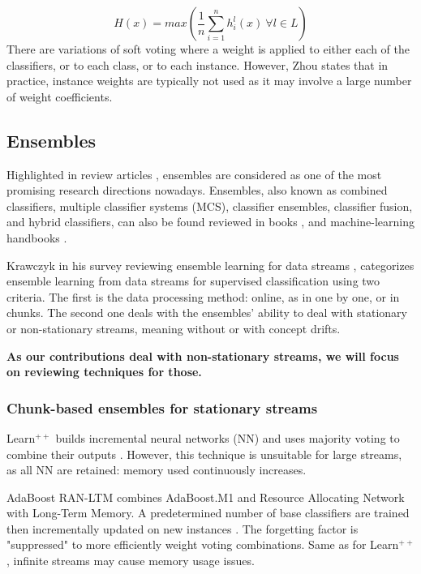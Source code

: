 \begin{equation}
H(x)=max( \frac{1}{n}\sum_{i=1}^nh_i^l(x)\ \forall l \in L)
\label{eq:simple_soft}
\end{equation}
There are variations of soft voting where a weight is applied to either each of the classifiers, or to each class, or to each instance. However, Zhou states that in practice, instance weights are typically not used as it may involve a large number of weight coefficients.



\subsection{Ensembles \label{section:ensembles}}
Highlighted in review articles \cite{jain2000statistical, KRAWCZYK2017132, oza2008classifier, polikar2006ensemble, rokach2009taxonomy, wozniak2014survey}, ensembles are considered as one of the most promising research directions nowadays. Ensembles, also known as combined classifiers, multiple classifier systems (MCS), classifier ensembles, classifier fusion, and hybrid classifiers, can also be found reviewed in books \cite{baruque2011fusion, kuncheva2004combining,rokach2010pattern,seni2010ensemble}, and machine-learning handbooks \cite{alpaydin2009introduction, duda2012pattern}.

Krawczyk in his survey reviewing ensemble learning for data streams \cite{KRAWCZYK2017132}, categorizes ensemble learning from data streams for supervised classification using two criteria. The first is the data processing method: online, as in one by one, or in chunks. The second one deals with the ensembles' ability to deal with stationary or non-stationary streams, meaning without or with concept drifts.

\textbf{As our contributions deal with non-stationary streams, we will focus on reviewing techniques for those.}

\subsubsection{Chunk-based ensembles for stationary streams}

Learn$^{++}$ builds incremental neural networks (NN) and uses majority voting to combine their outputs \cite{polikar2001learn++, KRAWCZYK2017132}. However, this technique is unsuitable for large streams, as all NN are retained: memory used continuously increases.

AdaBoost RAN-LTM combines AdaBoost.M1 and Resource Allocating Network with Long-Term Memory. A predetermined number of base classifiers are trained then incrementally updated on new instances \cite{kidera2006incremental, KRAWCZYK2017132}. The forgetting factor is "suppressed" to more efficiently weight voting combinations. Same as for Learn$^{++}$, infinite streams may cause memory usage issues.

